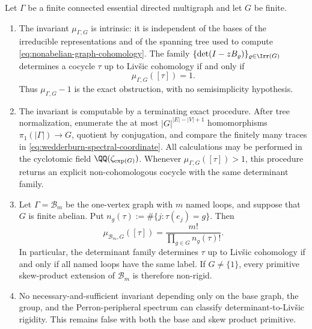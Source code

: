 \begin{theorem}
  \label{thm:sharp-spectral-cohomology-classification}
  Let \(\Gamma\) be a finite connected essential directed multigraph and let
  \(G\) be finite.
  \begin{enumerate}[label=\textup{(\alph*)},leftmargin=*]
    \item The invariant \(\mu_{\Gamma,G}\) is intrinsic: it is independent
    of the bases of the irreducible representations and of the spanning tree
    used to compute \eqref{eq:nonabelian-graph-cohomology}.  The family
    \(\{\det(I-zB_\varrho)\}_{\varrho\in\Irr(G)}\) determines a cocycle
    \(\tau\) up to Liv\v{s}ic cohomology if and only if
    \begin{equation}\label{eq:sharp-rigidity-multiplicity-one}
      \mu_{\Gamma,G}([\tau])=1.
    \end{equation}
    Thus \(\mu_{\Gamma,G}-1\) is the exact obstruction, with no
    semisimplicity hypothesis.
    \item The invariant is computable by a terminating exact procedure.
    After tree normalization, enumerate the at most \(|G|^{|E|-|V|+1}\)
    homomorphisms \(\pi_1(|\Gamma|)\to G\), quotient by conjugation, and
    compare the finitely many traces in
    \eqref{eq:wedderburn-spectral-coordinate}.  All calculations may be
    performed in the cyclotomic field \(\QQ(\zeta_{\exp(G)})\).  Whenever
    \(\mu_{\Gamma,G}([\tau])>1\), this procedure returns an explicit
    non-cohomologous cocycle with the same determinant family.
    \item Let \(\Gamma=\mathcal B_m\) be the one-vertex graph with \(m\)
    named loops, and suppose that \(G\) is finite abelian.  Put
    \(n_g(\tau):=\#\{j:\tau(e_j)=g\}\).  Then
    \begin{equation}\label{eq:abelian-bouquet-multiplicity-formula}
      \mu_{\mathcal B_m,G}([\tau])
      =\frac{m!}{\prod_{g\in G}n_g(\tau)!}.
    \end{equation}
    In particular, the determinant family determines \(\tau\) up to
    Liv\v{s}ic cohomology if and only if all named loops have the same label.
    If \(G\ne\{1\}\), every primitive skew-product extension of
    \(\mathcal B_m\) is therefore non-rigid.
    \item No necessary-and-sufficient invariant depending only on the base
    graph, the group, and the Perron-peripheral spectrum can classify
    determinant-to-Liv\v{s}ic rigidity.  This remains false with both the base
    and skew product primitive.
  \end{enumerate}
\end{theorem}

